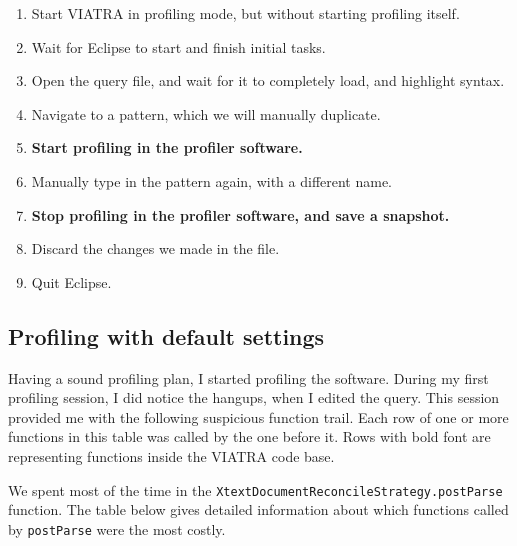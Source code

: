 \documentclass[11pt,a4paper,oneside]{report}
\begin{document}
\begin{enumerate}
    \item{Start VIATRA in profiling mode, but without starting profiling itself.}
    \item{Wait for Eclipse to start and finish initial tasks.}
    \item{Open the query file, and wait for it to completely load, and highlight syntax.}
    \item{Navigate to a pattern, which we will manually duplicate.}
    \item{\textbf{Start profiling in the profiler software.}}
    \item{Manually type in the pattern again, with a different name.}
    \item{\textbf{Stop profiling in the profiler software, and save a snapshot.}}
    \item{Discard the changes we made in the file.}
    \item{Quit Eclipse.}
\end{enumerate}

\subsection{Profiling with default settings}
Having a sound profiling plan, I started profiling the software. During my
first profiling session, I did notice the hangups, when I edited the query. This
session provided me with the following suspicious function trail. Each row of
one or more functions in this table was called by the one before it. Rows with
bold font are representing functions inside the VIATRA code base.

We spent most of the time in the
\texttt{XtextDocumentReconcileStrategy.postParse} function. The table below
gives detailed information about which functions called by \texttt{postParse}
were the most costly.
\end{document}
